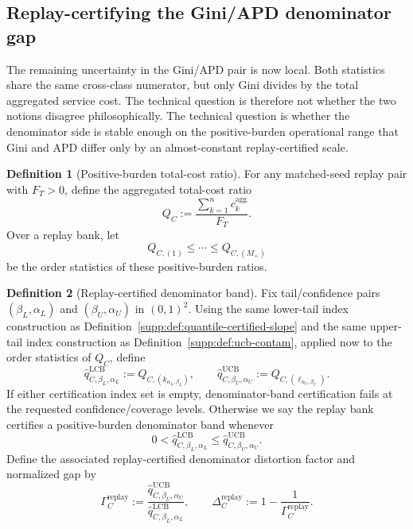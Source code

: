 \documentclass[11pt]{article}
\newcommand{\1}{\mathbf{1}}
\theoremstyle{definition}
\newtheorem{definition}{Definition}[section]
\theoremstyle{plain}
\theoremstyle{remark}
\begin{document}
\subsection{Replay-certifying the Gini/APD denominator gap}
\label{supp:subsec:gini-apd-gap}

The remaining uncertainty in the Gini/APD pair is now local. Both statistics share the same cross-class numerator, but only Gini divides by the total aggregated service cost. The technical question is therefore not whether the two notions disagree philosophically. The technical question is whether the denominator side is stable enough on the positive-burden operational range that Gini and APD differ only by an almost-constant replay-certified scale.

\begin{definition}[Positive-burden total-cost ratio]
\label{supp:def:positive-burden-total-cost}
For any matched-seed replay pair with $F_T>0$, define the aggregated total-cost ratio
\[
Q_C := \frac{\sum_{k=1}^n c_k^{\mathrm{agg}}}{F_T}.
\]
Over a replay bank, let
\[
Q_{C,(1)}\le \cdots \le Q_{C,(M_+)}
\]
be the order statistics of these positive-burden ratios.
\end{definition}

\begin{definition}[Replay-certified denominator band]
\label{supp:def:replay-denominator-band}
Fix tail/confidence pairs $(\beta_L,\alpha_L)$ and $(\beta_U,\alpha_U)$ in $(0,1)^2$. Using the same lower-tail index construction as Definition~\ref{supp:def:quantile-certified-slope} and the same upper-tail index construction as Definition~\ref{supp:def:ucb-contam}, applied now to the order statistics of $Q_C$, define
\[
\widehat q_{C,\beta_L,\alpha_L}^{\mathrm{LCB}} := Q_{C,(k_{\alpha_L,\beta_L})},
\qquad
\widehat q_{C,\beta_U,\alpha_U}^{\mathrm{UCB}} := Q_{C,(\ell_{\alpha_U,\beta_U})}.
\]
If either certification index set is empty, denominator-band certification fails at the requested confidence/coverage levels. Otherwise we say the replay bank certifies a positive-burden denominator band whenever
\[
0<\widehat q_{C,\beta_L,\alpha_L}^{\mathrm{LCB}}\le \widehat q_{C,\beta_U,\alpha_U}^{\mathrm{UCB}}.
\]
Define the associated replay-certified denominator distortion factor and normalized gap by
\[
\Gamma_C^{\mathrm{replay}}
:=
\frac{\widehat q_{C,\beta_U,\alpha_U}^{\mathrm{UCB}}}{\widehat q_{C,\beta_L,\alpha_L}^{\mathrm{LCB}}},
\qquad
\Delta_C^{\mathrm{replay}}
:=
1-\frac{1}{\Gamma_C^{\mathrm{replay}}}.
\]
\end{definition}
\end{document}
